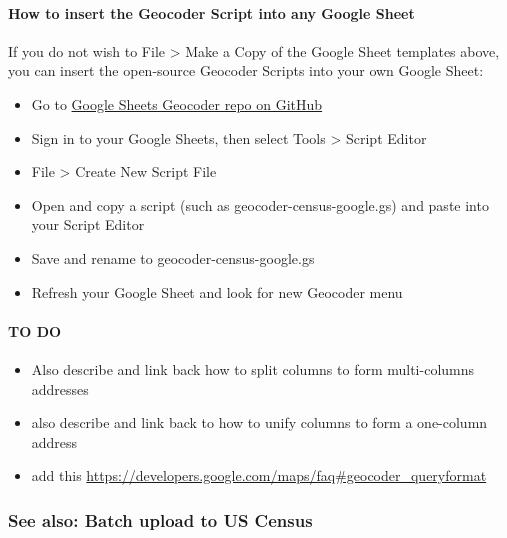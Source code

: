 \documentclass[
  english,
]{book}
\providecommand{\tightlist}{%
  \setlength{\itemsep}{0pt}\setlength{\parskip}{0pt}}
\begin{document}
\hypertarget{how-to-insert-the-geocoder-script-into-any-google-sheet}{%
\paragraph{How to insert the Geocoder Script into any Google Sheet}\label{how-to-insert-the-geocoder-script-into-any-google-sheet}}

If you do not wish to File \textgreater{} Make a Copy of the Google Sheet templates above, you can insert the open-source Geocoder Scripts into your own Google Sheet:

\begin{itemize}
\tightlist
\item
  Go to \href{https://github.com/datavizforall/google-sheets-geocoder}{Google Sheets Geocoder repo on GitHub}
\item
  Sign in to your Google Sheets, then select Tools \textgreater{} Script Editor
\item
  File \textgreater{} Create New Script File
\item
  Open and copy a script (such as geocoder-census-google.gs) and paste into your Script Editor
\item
  Save and rename to geocoder-census-google.gs
\item
  Refresh your Google Sheet and look for new Geocoder menu
\end{itemize}

\hypertarget{to-do-2}{%
\paragraph{TO DO}\label{to-do-2}}

\begin{itemize}
\tightlist
\item
  Also describe and link back how to split columns to form multi-columns addresses
\item
  also describe and link back to how to unify columns to form a one-column address
\item
  add this \url{https://developers.google.com/maps/faq\#geocoder_queryformat}
\end{itemize}

\hypertarget{see-also-batch-upload-to-us-census}{%
\subsubsection*{See also: Batch upload to US Census}\label{see-also-batch-upload-to-us-census}}
\end{document}

